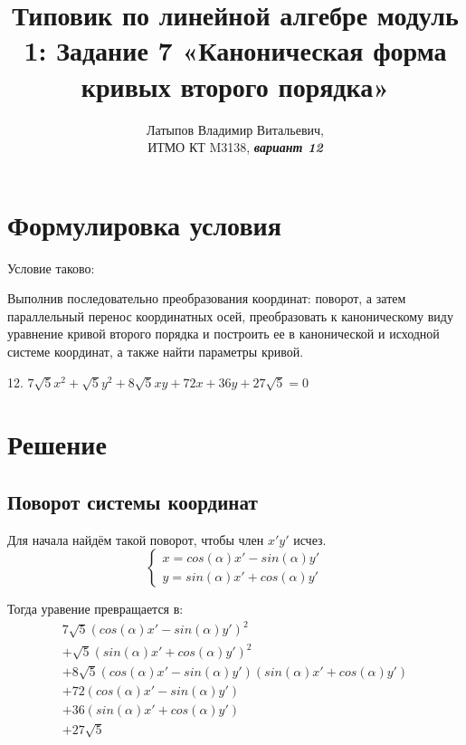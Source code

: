 \documentclass[12pt, a4paper]{article}
\author{Латыпов Владимир Витальевич, \\ ИТМО КТ M3138, \Huge{\textit{\textbf{вариант 12}}}}
\title{Типовик по линейной алгебре модуль 1: Задание 7 «Каноническая форма кривых второго порядка»}
\begin{document}
    \tittoc

    \section{Формулировка условия}

    \begin{statement}
        Условие таково: 
        
        Выполнив последовательно преобразования координат: поворот, а
        затем параллельный перенос координатных осей, преобразовать к
        каноническому виду уравнение кривой второго порядка и построить ее в
        канонической и исходной системе координат, а также найти параметры
        кривой.

        12. $7\sqrt{5} x^2 + \sqrt{5}y^2 + 8\sqrt{5}xy + 72x + 36y + 27\sqrt{5} = 0$
    \end{statement}

    \section{Решение}


    \subsection{Поворот системы координат}
    
    Для начала найдём такой поворот, чтобы член $x'y'$ исчез.
    \begin{equation}
        \begin{cases}
            x = cos(\alpha) x' - sin(\alpha) y' \\
            y = sin(\alpha) x' + cos(\alpha) y'
        \end{cases}
    \end{equation}

    Тогда уравение превращается в:
    \begin{multline}
        7\sqrt{5} (cos(\alpha) x' - sin(\alpha) y')^2 \\
        + \sqrt{5}(sin(\alpha) x' + cos(\alpha) y')^2 \\
        + 8\sqrt{5}(cos(\alpha) x' - sin(\alpha) y')(sin(\alpha) x' + cos(\alpha) y') \\
        + 72 (cos(\alpha) x' - sin(\alpha) y') \\
        + 36 (sin(\alpha) x' + cos(\alpha) y') \\
        + 27\sqrt{5}
    \end{multline}
\end{document}
